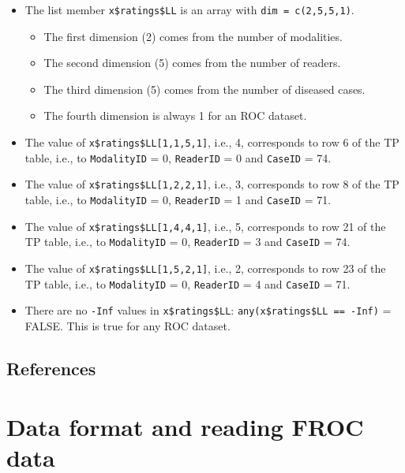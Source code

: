 \documentclass[
]{book}
\providecommand{\tightlist}{%
  \setlength{\itemsep}{0pt}\setlength{\parskip}{0pt}}
\begin{document}
\begin{itemize}
\tightlist
\item
  The list member \texttt{x\$ratings\$LL} is an array with \texttt{dim\ =\ c(2,5,5,1)}.

  \begin{itemize}
  \tightlist
  \item
    The first dimension (2) comes from the number of modalities.
  \item
    The second dimension (5) comes from the number of readers.
  \item
    The third dimension (5) comes from the number of diseased cases.
  \item
    The fourth dimension is always 1 for an ROC dataset.
  \end{itemize}
\item
  The value of \texttt{x\$ratings\$LL{[}1,1,5,1{]}}, i.e., 4, corresponds to row 6 of the TP table, i.e., to \texttt{ModalityID} = 0, \texttt{ReaderID} = 0 and \texttt{CaseID} = 74.
\item
  The value of \texttt{x\$ratings\$LL{[}1,2,2,1{]}}, i.e., 3, corresponds to row 8 of the TP table, i.e., to \texttt{ModalityID} = 0, \texttt{ReaderID} = 1 and \texttt{CaseID} = 71.
\item
  The value of \texttt{x\$ratings\$LL{[}1,4,4,1{]}}, i.e., 5, corresponds to row 21 of the TP table, i.e., to \texttt{ModalityID} = 0, \texttt{ReaderID} = 3 and \texttt{CaseID} = 74.
\item
  The value of \texttt{x\$ratings\$LL{[}1,5,2,1{]}}, i.e., 2, corresponds to row 23 of the TP table, i.e., to \texttt{ModalityID} = 0, \texttt{ReaderID} = 4 and \texttt{CaseID} = 71.
\item
  There are no \texttt{-Inf} values in \texttt{x\$ratings\$LL}: \texttt{any(x\$ratings\$LL\ ==\ -Inf)} = FALSE. This is true for any ROC dataset.
\end{itemize}

\hypertarget{quick-start-read-datafile-references}{%
\section{References}\label{quick-start-read-datafile-references}}

\hypertarget{quick-start-froc-data-format}{%
\chapter{Data format and reading FROC data}\label{quick-start-froc-data-format}}
\end{document}
